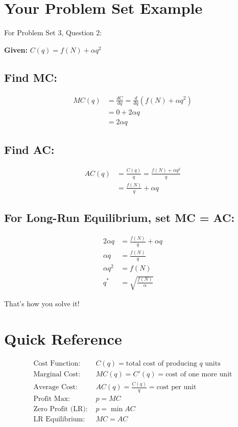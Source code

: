 \documentclass[11pt]{article}
\begin{document}
\section{Your Problem Set Example}

For Problem Set 3, Question 2:

\textbf{Given:} $C(q) = f(N) + \alpha q^2$

\subsection*{Find MC:}
\begin{align*}
MC(q) &= \frac{dC}{dq} = \frac{d}{dq}\left(f(N) + \alpha q^2\right) \\
&= 0 + 2\alpha q \\
&= 2\alpha q
\end{align*}

\subsection*{Find AC:}
\begin{align*}
AC(q) &= \frac{C(q)}{q} = \frac{f(N) + \alpha q^2}{q} \\
&= \frac{f(N)}{q} + \alpha q
\end{align*}

\subsection*{For Long-Run Equilibrium, set MC = AC:}
\begin{align*}
2\alpha q &= \frac{f(N)}{q} + \alpha q \\
\alpha q &= \frac{f(N)}{q} \\
\alpha q^2 &= f(N) \\
q^* &= \sqrt{\frac{f(N)}{\alpha}}
\end{align*}

That's how you solve it!

\section{Quick Reference}

\begin{tcolorbox}[colback=yellow!10, colframe=orange!75!black, title=Summary:]
\begin{align*}
\text{Cost Function: } & C(q) = \text{total cost of producing } q \text{ units} \\[0.3cm]
\text{Marginal Cost: } & MC(q) = C'(q) = \text{cost of one more unit} \\[0.3cm]
\text{Average Cost: } & AC(q) = \frac{C(q)}{q} = \text{cost per unit} \\[0.5cm]
\text{Profit Max: } & p = MC \\[0.3cm]
\text{Zero Profit (LR): } & p = \min AC \\[0.3cm]
\text{LR Equilibrium: } & MC = AC
\end{align*}
\end{tcolorbox}
\end{document}
